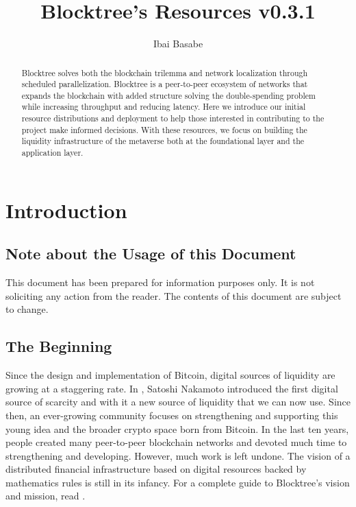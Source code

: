 \documentclass[12pt]{article}
\title{Blocktree's Resources v0.3.1}
\author{Ibai Basabe}
\date{}           %
\begin{document}
\pagecolor{white}

\maketitle

\begin{abstract}

Blocktree solves both the blockchain trilemma and network localization through scheduled parallelization. Blocktree is a peer-to-peer ecosystem of networks that expands the blockchain with added structure solving the double-spending problem while increasing throughput and reducing latency. Here we introduce our initial resource distributions and deployment to help those interested in contributing to the project make informed decisions. With these resources, we focus on building the liquidity infrastructure of the metaverse both at the foundational layer and the application layer. 

\end{abstract}

\tableofcontents
\newpage



\section{Introduction}

\subsection{Note about the Usage of this Document}

This document has been prepared for information purposes only. It is not soliciting any action from the reader. The contents of this document are subject to change.

\subsection{The Beginning }

Since the design and implementation of Bitcoin, digital sources of liquidity are growing at a staggering rate. In \cite{N}, Satoshi Nakamoto introduced the first digital source of scarcity and with it a new source of liquidity that we can now use. Since then, an ever-growing community focuses on strengthening and supporting this young idea and the broader crypto space born from Bitcoin. In the last ten years, people created many peer-to-peer blockchain networks and devoted much time to strengthening and developing. However, much work is left undone. The vision of a distributed financial infrastructure based on digital resources backed by mathematics rules is still in its infancy. For a complete guide to Blocktree's vision and mission, read \cite{B}.
\end{document}
